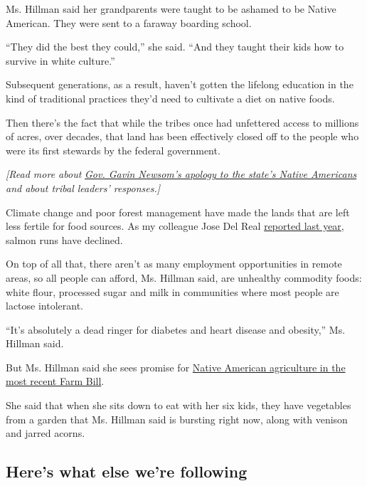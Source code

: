 Ms. Hillman said her grandparents were taught to be ashamed to be Native
American. They were sent to a faraway boarding school.

``They did the best they could,'' she said. ``And they taught their kids
how to survive in white culture.''

Subsequent generations, as a result, haven't gotten the lifelong
education in the kind of traditional practices they'd need to cultivate
a diet on native foods.

Then there's the fact that while the tribes once had unfettered access
to millions of acres, over decades, that land has been effectively
closed off to the people who were its first stewards by the federal
government.

\emph{{[}Read more about}
\href{https://www.nytimes3xbfgragh.onion/2019/06/19/us/newsom-native-american-apology.html?smid=nytcore-ios-share}{\emph{Gov.
Gavin Newsom's apology to the state's Native Americans}} \emph{and about
tribal leaders' responses.{]}}

Climate change and poor forest management have made the lands that are
left less fertile for food sources. As my colleague Jose Del Real
\href{https://www.nytimes3xbfgragh.onion/2018/09/04/us/klamath-river-california-tribes-heroin.html}{reported
last year}, salmon runs have declined.

On top of all that, there aren't as many employment opportunities in
remote areas, so all people can afford, Ms. Hillman said, are unhealthy
commodity foods: white flour, processed sugar and milk in communities
where most people are lactose intolerant.

``It's absolutely a dead ringer for diabetes and heart disease and
obesity,'' Ms. Hillman said.

But Ms. Hillman said she sees promise for
\href{https://civileats.com/2019/07/24/indigenous-food-security-is-dependent-on-food-sovereignty/}{Native
American agriculture in the most recent Farm Bill}.

She said that when she sits down to eat with her six kids, they have
vegetables from a garden that Ms. Hillman said is bursting right now,
along with venison and jarred acorns.

\hypertarget{heres-what-else-were-following}{%
\subsection{Here's what else we're
following}\label{heres-what-else-were-following}}

